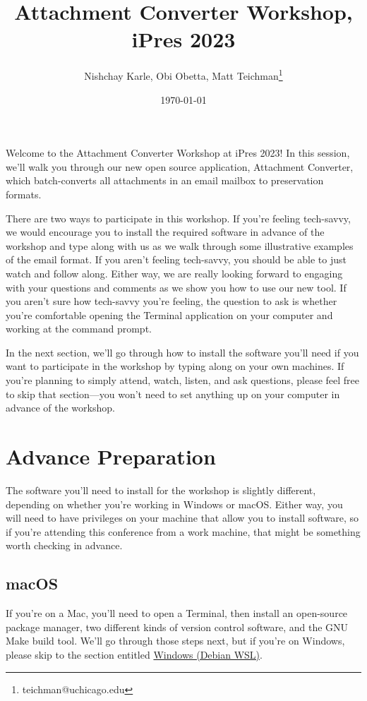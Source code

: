 \documentclass[11pt]{article}
\author{Nishchay Karle, Obi Obetta, Matt Teichman\thanks{teichman@uchicago.edu}}
\date{\today}
\title{Attachment Converter Workshop, iPres 2023}
\begin{document}
\maketitle
Welcome to the Attachment Converter Workshop at iPres 2023!  In this
session, we'll walk you through our new open source application,
Attachment Converter, which batch-converts all attachments in an email
mailbox to preservation formats.

There are two ways to participate in this workshop.  If you're feeling
tech-savvy, we would encourage you to install the required software in
advance of the workshop and type along with us as we walk through some
illustrative examples of the email format.  If you aren't feeling
tech-savvy, you should be able to just watch and follow along.  Either
way, we are really looking forward to engaging with your questions and
comments as we show you how to use our new tool.  If you aren't sure
how tech-savvy you're feeling, the question to ask is whether you're
comfortable opening the Terminal application on your computer and
working at the command prompt.

In the next section, we'll go through how to install the software
you'll need if you want to participate in the workshop by typing along
on your own machines.  If you're planning to simply attend, watch,
listen, and ask questions, please feel free to skip that section---you
won't need to set anything up on your computer in advance of the
workshop.

\section*{Advance Preparation}
\label{sec:org6472cd9}

The software you'll need to install for the workshop is slightly
different, depending on whether you're working in Windows or macOS.
Either way, you will need to have privileges on your machine that
allow you to install software, so if you're attending this conference
from a work machine, that might be something worth checking in
advance.

\subsection*{macOS}
\label{sec:org2345871}

If you're on a Mac, you'll need to open a Terminal, then install an
open-source package manager, two different kinds of version control
software, and the GNU Make build tool.  We'll go through those steps
next, but if you're on Windows, please skip to the section entitled
\hyperref[org894ea3e]{Windows (Debian WSL)}.
\end{document}
